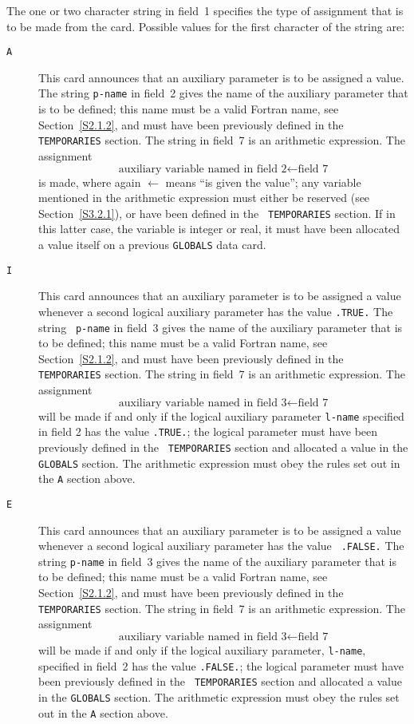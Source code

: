 \documentclass[a4paper]{article}
\newcommand{\bdmath}{\begin{displaymath}}
\newcommand{\edmath}{\end{displaymath}}
\begin{document}
The one or two   character string  in field~1  specifies the  type  of
assignment that is to be  made from  the card.
Possible values for the
first character of the string are:
\begin{description}
\item[\tt A]
This card
announces that an auxiliary  parameter is  to be assigned a
value. The  string {\tt   p-name} in field~2 gives  the  name of the
auxiliary parameter that is  to be defined; this name  must be a valid
Fortran name, see Section~\ref{S2.1.2},  and must have been previously
defined in the {\tt TEMPORARIES}
section.  The string  in  field~7  is an  arithmetic   expression. The
assignment
\bdmath
\mbox{auxiliary variable named in field~2} \leftarrow \mbox{field~7}
\edmath
is made, where  again $\leftarrow$ means ``is  given the  value''; any
variable   mentioned   in the    arithmetic expression must  either be
reserved (see Section~\ref{S3.2.1}), or  have been defined in the {\tt
TEMPORARIES}
section. If in this latter case, the variable  is integer  or real, it
must have been allocated a value itself on a previous {\tt GLOBALS}
data card.

\item[\tt I]
This card
announces that an  auxiliary parameter  is to be assigned  a
value whenever a second logical
auxiliary  parameter has  the value   {\tt  .TRUE.}  The string  {\tt
p-name} in field~3 gives the name of the  auxiliary parameter that is
to be defined; this name must be a valid Fortran name,
see Section~\ref{S2.1.2}, and must have been
previously defined in the {\tt TEMPORARIES}
section.  The string in field~7 is an arithmetic expression. The assignment
\bdmath
\mbox{auxiliary variable named in field~3} \leftarrow \mbox{field~7}
\edmath
will be made  if and only   if the logical
auxiliary parameter {\tt l-name} specified in   field  2  has the
value  {\tt .TRUE.};  the
logical  parameter   must have  been previously   defined  in the {\tt
TEMPORARIES}
section  and  allocated   a value in   the {\tt  GLOBALS}
section.  The arithmetic expression must obey the rules set out in the
{\tt A} section above.

\item[\tt E]
This card
announces that  an auxiliary  parameter is to be assigned  a
value whenever a second logical
auxiliary parameter has the value {\tt
.FALSE.} The string {\tt p-name}  in field~3 gives  the name of the
auxiliary parameter that is to be  defined; this name  must be a valid
Fortran name, see Section~\ref{S2.1.2},  and  must have been previously
defined in the {\tt TEMPORARIES}
section.  The string in field~7 is an
arithmetic expression. The assignment
\bdmath
\mbox{auxiliary variable named in field~3} \leftarrow \mbox{field~7}
\edmath
will be  made if and   only if the  logical auxiliary  parameter,
{\tt l-name}, specified in   field~2 has  the value   {\tt .FALSE.};  the
logical parameter  must  have  been  previously  defined in  the  {\tt
TEMPORARIES}
section   and allocated a  value  in   the {\tt GLOBALS}
section.  The arithmetic expression must obey the rules set out in the
{\tt A} section above.
\end{description}
\end{document}
